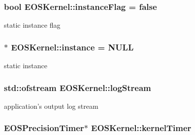 \hypertarget{structEOSKernel_73cfb100d6374fd4cd0f5a7e80179b06}{
\subsubsection[{instanceFlag}]{\setlength{\rightskip}{0pt plus 5cm}bool {\bf EOSKernel::instanceFlag} = false}}
\label{structEOSKernel_73cfb100d6374fd4cd0f5a7e80179b06}


static instance flag 

\hypertarget{structEOSKernel_b29a9811607e25ec65e6432fec112c74}{
\subsubsection[{instance}]{ $\ast$ {\bf EOSKernel::instance} = NULL}}
\label{structEOSKernel_b29a9811607e25ec65e6432fec112c74}


static instance 

\hypertarget{structEOSKernel_06d1a03f14d2102f0e92196db921a13e}{
\subsubsection[{logStream}]{\setlength{\rightskip}{0pt plus 5cm}std::ofstream {\bf EOSKernel::logStream}}}
\label{structEOSKernel_06d1a03f14d2102f0e92196db921a13e}


application's output log stream 

\hypertarget{structEOSKernel_cf859572d0066a9f3b14276c39d33845}{
\subsubsection[{kernelTimer}]{\setlength{\rightskip}{0pt plus 5cm}EOSPrecisionTimer$\ast$ {\bf EOSKernel::kernelTimer}}}
\label{structEOSKernel_cf859572d0066a9f3b14276c39d33845}


